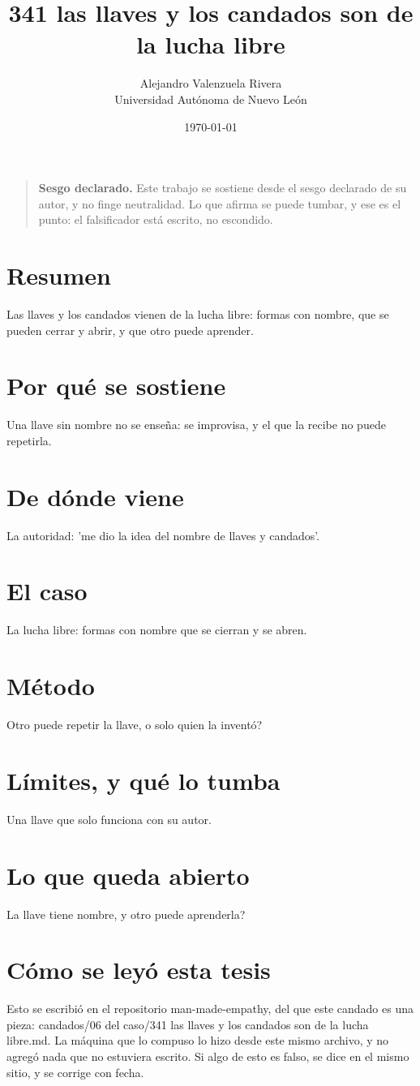 \documentclass[11pt,a4paper]{article}
\title{341 las llaves y los candados son de la lucha libre}
\author{Alejandro Valenzuela Rivera\\\small Universidad Autónoma de Nuevo León}
\date{\today}
\begin{document}
\maketitle

\begin{quote}
\textbf{Sesgo declarado.} Este trabajo se sostiene desde el sesgo declarado de su autor, y no finge neutralidad. Lo que afirma se puede tumbar, y ese es el punto: el falsificador está escrito, no escondido.
\end{quote}

\section*{Resumen}
Las llaves y los candados vienen de la lucha libre: formas con nombre, que se pueden cerrar y abrir, y que otro puede aprender.

\section{Por qué se sostiene}
Una llave sin nombre no se enseña: se improvisa, y el que la recibe no puede repetirla.

\section{De dónde viene}
La autoridad: 'me dio la idea del nombre de llaves y candados'.

\section{El caso}
La lucha libre: formas con nombre que se cierran y se abren.

\section{Método}
\textquestiondown{}Otro puede repetir la llave, o solo quien la inventó?

\section{Límites, y qué lo tumba}
Una llave que solo funciona con su autor.

\section{Lo que queda abierto}
\textquestiondown{}La llave tiene nombre, y otro puede aprenderla?

\section*{Cómo se leyó esta tesis}
Esto se escribió en el repositorio man-made-empathy, del que este candado es una pieza: candados/06 del caso/341 las llaves y los candados son de la lucha libre.md. La máquina que lo compuso lo hizo desde este mismo archivo, y no agregó nada que no estuviera escrito. Si algo de esto es falso, se dice en el mismo sitio, y se corrige con fecha.
\end{document}
